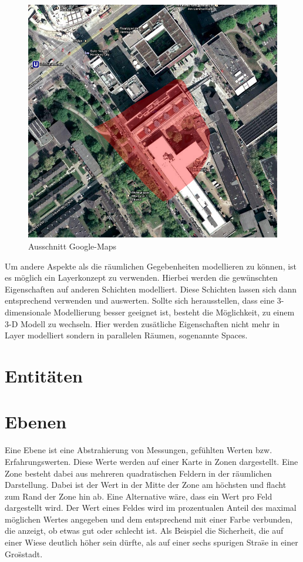 \documentclass[10pt]{scrartcl}
\begin{document}
        
      \begin{figure}[htbp]
        \centering
                \includegraphics[scale=0.5]{img/google_maps}
        \caption{Ausschnitt Google-Maps}
        \label{img:google_maps}
        \end{figure}  
        
        
        Um andere Aspekte als die räumlichen Gegebenheiten modellieren zu können, ist es möglich ein Layerkonzept zu verwenden. Hierbei werden die gewünschten Eigenschaften auf anderen Schichten modelliert. Diese Schichten lassen sich dann entsprechend verwenden und auswerten.
Sollte sich herausstellen, dass eine 3-dimensionale Modellierung besser geeignet ist, besteht die Möglichkeit, zu einem 3-D Modell zu wechseln. Hier werden zusätliche Eigenschaften nicht mehr in Layer modelliert sondern in parallelen Räumen, sogenannte Spaces.

\section{Entitäten}

\section{Ebenen}
Eine Ebene ist eine Abstrahierung von Messungen, gef\"uhlten Werten bzw. Erfahrungswerten. Diese Werte werden auf einer Karte in Zonen dargestellt. Eine Zone besteht dabei aus mehreren quadratischen Feldern in der r\"aumlichen Darstellung. Dabei ist der Wert in der Mitte der Zone am h\"ochsten und flacht zum Rand der Zone hin ab. Eine Alternative w\"are, dass ein Wert pro Feld dargestellt wird.
\newline Der Wert eines Feldes wird im prozentualen Anteil des maximal m\"oglichen Wertes angegeben und dem entsprechend mit einer Farbe verbunden, die anzeigt, ob etwas gut oder schlecht ist. Als Beispiel die Sicherheit, die auf einer Wiese deutlich h\"oher sein d\"urfte, als auf einer sechs spurigen Stra\"se in einer Gro\"sstadt.
\end{document}
